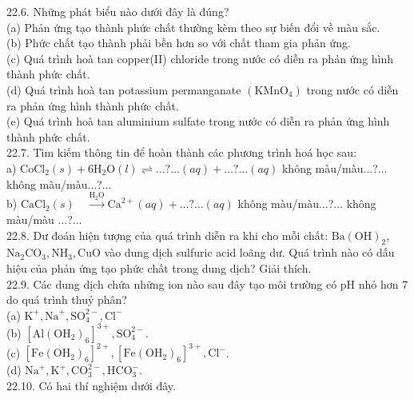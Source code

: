 \documentclass[10pt]{article}
\begin{document}
22.6. Những phát biểu nào dưới đây là đúng?\\
(a) Phản ứng tạo thành phức chất thường kèm theo sự biến đổi về màu sắc.\\
(b) Phức chất tạo thành phải bền hơn so với chất tham gia phản ứng.\\
(c) Quá trình hoà tan copper(II) chloride trong nước có diễn ra phản ứng hình thành phức chất.\\
(d) Quá trình hoà tan potassium permanganate $\left(\mathrm{KMnO}_{4}\right)$ trong nước có diễn ra phản ứng hình thành phức chất.\\
(e) Quá trình hoà tan aluminium sulfate trong nước có diễn ra phản ứng hình thành phức chất.\\
22.7. Tìm kiếm thông tin để hoàn thành các phương trình hoá học sau:\\
a) $\mathrm{CoCl}_{2}(s)+6 \mathrm{H}_{2} \mathrm{O}(l) \rightleftharpoons \ldots ? \ldots(a q)+\ldots ? \ldots(a q)$ không màu/màu...?... không màu/màu...?...\\
b) $\mathrm{CaCl}_{2}(s) \quad \xrightarrow{\mathrm{H}_{2} \mathrm{O}} \mathrm{Ca}^{2+}(a q)+\ldots ? \ldots(a q)$ không màu/màu...?... không màu/màu ...?...\\
22.8. Dư đoán hiện tượng của quá trình diễn ra khi cho mỗi chất: $\mathrm{Ba}(\mathrm{OH})_{2}$, $\mathrm{Na}_{2} \mathrm{CO}_{3}, \mathrm{NH}_{3}, \mathrm{CuO}$ vào dung dịch sulfuric acid loãng dư. Quá trình nào có dấu hiệu của phản ứng tạo phức chất trong dung dịch? Giải thích.\\
22.9. Các dung dịch chứa những ion nào sau đây tạo môi trường có pH nhỏ hơn 7 do quá trình thuỷ phân?\\
(a) $\mathrm{K}^{+}, \mathrm{Na}^{+}, \mathrm{SO}_{4}^{2-}, \mathrm{Cl}^{-}$\\
(b) $\left[\mathrm{Al}\left(\mathrm{OH}_{2}\right)_{6}\right]^{3+}, \mathrm{SO}_{4}^{2-}$.\\
(c) $\left[\mathrm{Fe}\left(\mathrm{OH}_{2}\right)_{6}\right]^{2+},\left[\mathrm{Fe}\left(\mathrm{OH}_{2}\right)_{6}\right]^{3+}, \mathrm{Cl}^{-}$.\\
(d) $\mathrm{Na}^{+}, \mathrm{K}^{+}, \mathrm{CO}_{3}^{2-}, \mathrm{HCO}_{3}^{-}$.\\
22.10. Có hai thí nghiệm dưới đây.
\end{document}
